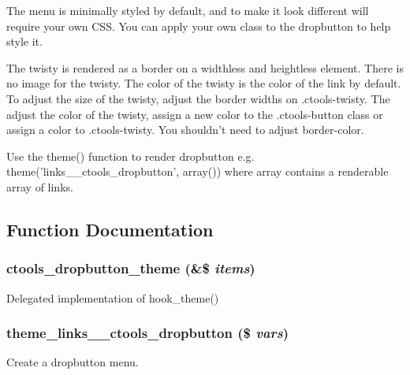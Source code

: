 The menu is minimally styled by default, and to make it look different will require your own CSS. You can apply your own class to the dropbutton to help style it.

The twisty is rendered as a border on a widthless and heightless element. There is no image for the twisty. The color of the twisty is the color of the link by default. To adjust the size of the twisty, adjust the border widths on .ctools-\/twisty. The adjust the color of the twisty, assign a new color to the .ctools-\/button class or assign a color to .ctools-\/twisty. You shouldn't need to adjust border-\/color.

Use the theme() function to render dropbutton e.g. theme('links\_\-\_\-ctools\_\-dropbutton', array()) where array contains a renderable array of links. 

\subsection{Function Documentation}
\hypertarget{dropbutton_8theme_8inc_a99047f738264a4430be947b0405f6334}{
\subsubsection[{ctools\_\-dropbutton\_\-theme}]{\setlength{\rightskip}{0pt plus 5cm}ctools\_\-dropbutton\_\-theme (\&\$ {\em items})}}
\label{dropbutton_8theme_8inc_a99047f738264a4430be947b0405f6334}
Delegated implementation of hook\_\-theme() \hypertarget{dropbutton_8theme_8inc_a17b29f655247ef7a2a5925a4963e7a6f}{
\subsubsection[{theme\_\-links\_\-\_\-ctools\_\-dropbutton}]{\setlength{\rightskip}{0pt plus 5cm}theme\_\-links\_\-\_\-ctools\_\-dropbutton (\$ {\em vars})}}
\label{dropbutton_8theme_8inc_a17b29f655247ef7a2a5925a4963e7a6f}
Create a dropbutton menu.


